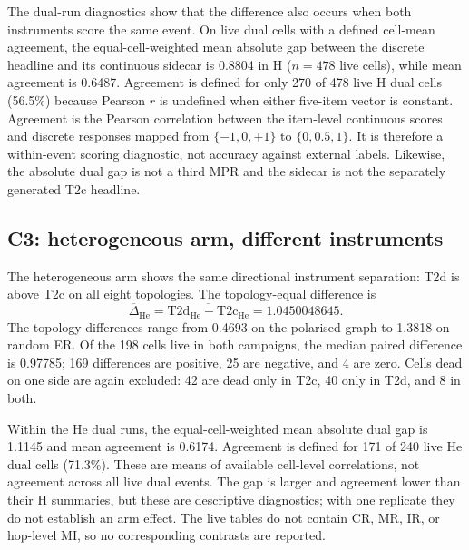 The dual-run diagnostics show that the difference also occurs when both
instruments score the same event.  On live dual cells with a defined
cell-mean agreement, the equal-cell-weighted mean absolute gap between the
discrete headline and its continuous sidecar is 0.8804 in H ($n=478$ live
cells), while mean agreement is 0.6487. Agreement is defined for only 270 of
478 live H dual cells (56.5\%) because Pearson $r$ is undefined when either
five-item vector is constant.  Agreement is the Pearson correlation between the
item-level continuous scores and discrete responses mapped from
$\{-1,0,+1\}$ to $\{0,0.5,1\}$.  It is therefore a within-event scoring
diagnostic, not accuracy against external labels.  Likewise, the absolute
dual gap is not a third MPR and the sidecar is not the separately generated
T2c headline.

\subsection{C3: heterogeneous arm, different instruments}
\label{subsec:c3-mpr}

The heterogeneous arm shows the same directional instrument separation:
T2d is above T2c on all eight topologies.  The topology-equal difference is
\[
  \overline{\Delta}_{\mathrm{He}}
  = \overline{\mathrm{T2d_{He}}-\mathrm{T2c_{He}}}
  = 1.0450048645 .
\]
The topology differences range from 0.4693 on the polarised graph to
1.3818 on random ER.  Of the 198 cells live in both campaigns, the median
paired difference is 0.97785; 169 differences are positive, 25 are negative,
and 4 are zero.  Cells dead on one side are again excluded: 42 are dead only
in T2c, 40 only in T2d, and 8 in both.

Within the He dual runs, the equal-cell-weighted mean absolute dual gap is
1.1145 and mean agreement is 0.6174. Agreement is defined for 171 of 240 live
He dual cells (71.3\%). These are means of available cell-level correlations,
not agreement across all live dual events.  The gap is larger and agreement lower than
their H summaries, but these are descriptive diagnostics; with one
replicate they do not establish an arm effect.  The live tables do not
contain CR, MR, IR, or hop-level MI, so no corresponding contrasts are
reported.

